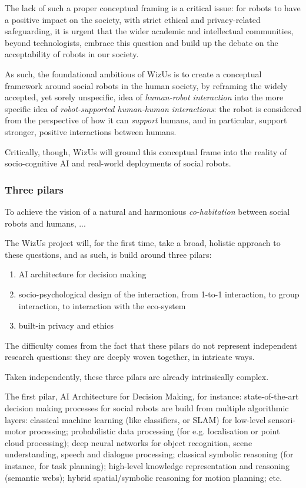 \documentclass[11pt]{article}
\newcommand{\project}{WizUs\xspace}
\begin{document}
The lack of such a proper conceptual framing is a critical issue: for robots to
have a positive impact on the society, with strict ethical and privacy-related
safeguarding, it is urgent that the wider academic and intellectual communities,
beyond technologists, embrace this question and build up the debate on the
acceptability of robots in our society.

As such, the foundational ambitious of \project is to create a conceptual
framework around social robots in the human society, by reframing the widely
accepted, yet sorely unspecific, idea of \emph{human-robot interaction} into the
more specific idea of \emph{robot-supported human-human interactions}: the robot
is considered from the perspective of how it can \emph{support} humans, and in
particular, support stronger, positive interactions between humans.

Critically, though, \project will ground this conceptual frame into the reality
of socio-cognitive AI and real-world deployments of social robots.


\subsubsection{Three pilars}

To achieve the vision of a natural and harmonious \emph{co-habitation} between
social robots and humans, ...

The \project project will, for the first time, take a broad, holistic approach
to these questions, and as such, is build around three pilars:

\begin{enumerate}
    \item AI architecture for decision making
    \item socio-psychological design of the interaction, from 1-to-1
        interaction, to group interaction, to interaction with the eco-system
    \item built-in privacy and ethics
\end{enumerate}

The difficulty comes from the fact that these pilars do not represent independent
research questions: they are deeply woven together, in intricate ways.


Taken independently, these three pilars are already intrinsically complex.

The first pilar, AI Architecture for Decision Making, for instance:
state-of-the-art decision making processes for social robots are build from
multiple algorithmic layers: classical machine learning (like classifiers, or
SLAM) for low-level sensori-motor processing; probabilistic data processing (for
e.g. localisation or point cloud processing); deep neural networks for object
recognition, scene understanding, speech and dialogue processing; classical
symbolic reasoning (for instance, for task planning); high-level knowledge
representation and reasoning (semantic webs); hybrid spatial/symbolic reasoning
for motion planning; etc.
\end{document}
